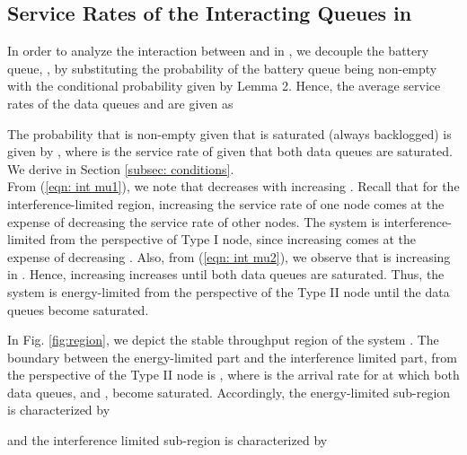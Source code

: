 \documentclass[draftcls,12pt,onecolumn]{IEEEtran}
\begin{document}
\subsection{Service Rates of the Interacting Queues in }
In order to analyze the interaction between  and  in , we decouple the battery queue, , by substituting the probability of the battery queue being non-empty with the conditional probability given by Lemma 2. Hence, the average service rates of the data queues  and  are given as 
\vspace{-0.4in}

The probability that  is non-empty given that  is saturated (always backlogged) is given by , where  is the service rate of  given that both data queues are saturated. We derive  in Section \ref{subsec: conditions}.\\
\indent From (\ref{eqn: int mu1}), we note that  decreases with increasing . Recall that for the interference-limited region, increasing the service rate of one node comes at the expense of decreasing the service rate of other nodes. The system is interference-limited from the perspective of Type I node, since increasing  comes at the expense of decreasing . Also, from (\ref{eqn: int mu2}), we observe that  is increasing in .
Hence, increasing  increases  until both data queues are saturated. Thus, the system is energy-limited from the perspective of the Type II node until the data queues become saturated.

In Fig. \ref{fig:region}, we depict the stable throughput region  of the system . The boundary between the energy-limited part and the interference limited part, from the perspective of the Type II node is , where  is the arrival rate for  at which both data queues,  and , become saturated. Accordingly, the energy-limited sub-region is characterized by 

and the interference limited sub-region is characterized by  
\end{document}
